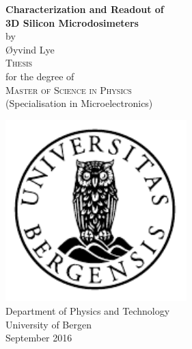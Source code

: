 \documentclass[12pt, a4paper]{report}
\begin{document}
\maketitle

\newcommand{\blankpage}{\newpage{}\thispagestyle{empty}\mbox{}\newpage{}}
\newcommand{\HRule}{\rule{\linewidth}{0.5mm}}

\begin{titlepage}
\begin{center}
{ \Huge \bfseries Characterization and Readout of\\3D Silicon Microdosimeters}\\[1cm]

\large by\\ \Large Øyvind Lye\\[1.6cm]

\textsc{\Large Thesis}\\
\large for the degree of\\
\textsc{\Large Master of Science in Physics}\\[0.5cm]
\large (Specialisation in Microelectronics) \\[0.5cm]


\end{center}
\vfill
\begin{center}
{
	\includegraphics[width=7cm]{uib-emblem-svart}\\[0.5cm]
	
	\large {Department of Physics and Technology}\\
	\large {University of Bergen}\\[1cm]
	September 2016}
\end{center}
\end{titlepage}
\end{document}
